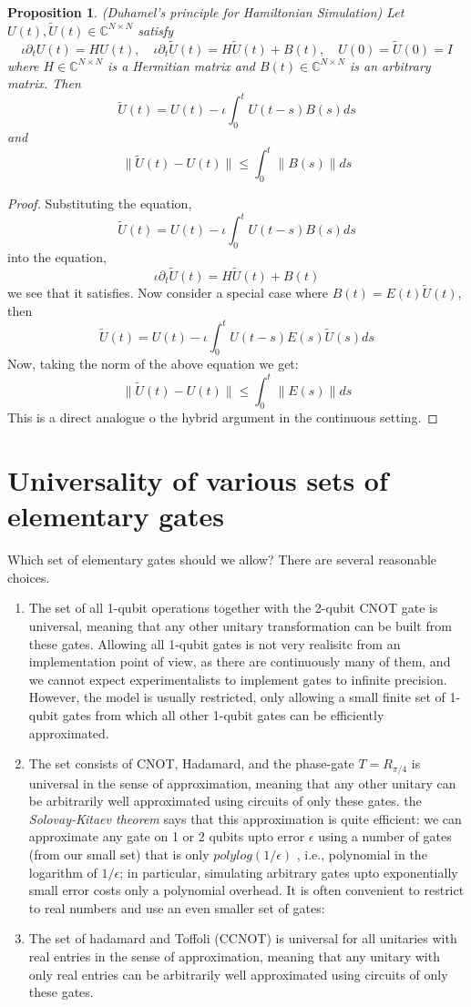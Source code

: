 \documentclass[12pt, oneside]{book}
\newtheorem{proposition}[theorem]{Proposition}
\theoremstyle{definition}
\theoremstyle{definition}
\theoremstyle{remark}
\begin{document}
\begin{proposition}
    \textit{(Duhamel's principle for Hamiltonian Simulation)} Let $U(t),\tilde{U}(t) \in \mathbb{C}^{N \times N}$
    satisfy
    \[ \iota \partial_t U(t)=HU(t), \quad \iota\partial_t \tilde{U}(t) = H\tilde{U}(t) + B(t), \quad U(0)=\tilde{U}(0)=I \]
    where $H \in \mathbb{C}^{N \times N}$ is a Hermitian matrix and $B(t) \in \mathbb{C}^{N \times N}$ is an arbitrary matrix. Then
    \[ \tilde{U}(t)=U(t)-\iota\int_0^t U(t-s)B(s)ds \]
    and
    \[\|\tilde{U}(t)-U(t)\|\leq \int_0^t\|B(s)\|ds\]
\end{proposition}
\begin{proof}
    Substituting the equation,
    \[ \tilde{U}(t)=U(t)-\iota\int_0^t U(t-s)B(s)ds \]
    into the equation,
    \[ \iota\partial_t \tilde{U}(t) = H\tilde{U}(t)+B(t) \]
    we see that it satisfies.
    Now consider a special case where $B(t)=E(t)\tilde{U}(t)$, then
    \[\tilde{U}(t)=U(t)-\iota \int_0^t U(t-s)E(s)\tilde{U}(s)ds\]
    Now, taking the norm of the above equation we get:
    \[\|\tilde{U}(t)-U(t)\|\leq \int_0^t\|E(s)\|ds\]
    This is a direct analogue o the hybrid argument in the continuous setting.
\end{proof}

\section{Universality of various sets of elementary gates}
Which set of elementary gates should we allow? There are several reasonable choices.
\begin{enumerate}
    \item The set of all 1-qubit operations together with the 2-qubit CNOT gate is universal, meaning that any other unitary transformation can be built from these gates. Allowing all 1-qubit gates is not very realisitc from an implementation point of view, as there are continuously many of them, and we cannot expect experimentalists to implement gates to infinite precision. However, the model is usually restricted, only allowing a small finite set of 1-qubit gates from which all other 1-qubit gates can be efficiently approximated.
    \item The set consists of CNOT, Hadamard, and the phase-gate $T=R_{\pi/4}$ is universal in the sense of approximation, meaning that any other unitary can be arbitrarily well approximated using circuits of only these gates. the \textit{Solovay-Kitaev theorem} says that this approximation is quite efficient: we can approximate any gate on 1 or 2 qubits upto error $\epsilon$ using a number of gates (from our small set) that is only $polylog(1/\epsilon)$ , i.e., polynomial in the logarithm of $1/\epsilon$; in particular, simulating arbitrary gates upto exponentially small error costs only a polynomial overhead. It is often convenient to restrict to real numbers and use an even smaller set of gates:
    \item The set of hadamard and Toffoli (CCNOT) is universal for all unitaries with real entries in the sense of approximation, meaning that any unitary with only real entries can be arbitrarily well approximated using circuits of only these gates.
\end{enumerate}
\end{document}
